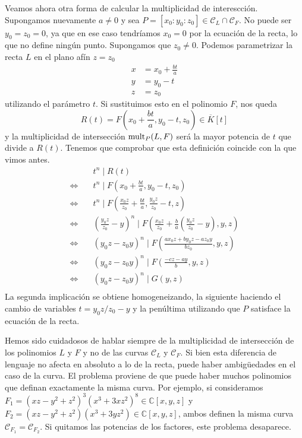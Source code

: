 \documentclass[a4paper, 11pt]{article}
\newcommand{\CC}{\mathbb{C}}
\theoremstyle{plain}
\theoremstyle{definition}
\begin{document}
Veamos ahora otra forma de calcular la multiplicidad de interescción. Supongamos
nuevamente $a\neq 0$ y sea $P=[x_0:y_0:z_0]\in\mathcal{C}_L\cap\mathcal{C}_F$. No
puede ser $y_0=z_0=0$, ya que en ese caso tendríamos $x_0=0$ por la ecuación de la recta,
lo que no define ningún punto. Supongamos que $z_0\neq 0$. Podemos parametrizar la recta
$L$ en el plano afín $z=z_0$
\[
\begin{aligned}
 x & = x_0 + \frac{bt}{a}\\
 y & = y_0 - t \\
 z & = z_0
\end{aligned}
\]
utilizando el parámetro $t$. Si sustituimos esto en el polinomio $F$, nos queda
\[
  R(t)=F\left(x_0+\frac{bt}{a},y_0-t,z_0\right)\in\overline{K}[t]
\]
y la multiplicidad de intersección ${\rm mult}_P(L,F)$ será la mayor potencia de $t$
que divide a $R(t)$. Tenemos que comprobar que esta definición coincide con la que
vimos antes.
\[
\begin{aligned}
 & t^n\mid R(t) \\
\Longleftrightarrow\quad
 & t^n\mid F\left(x_0+\frac{bt}{a},y_0-t,z_0\right) \\
\Longleftrightarrow\quad
 & t^n\mid F\left(\frac{x_0z}{z_0}+\frac{bt}{a},\frac{y_0z}{z_0}-t,z\right) \\
\Longleftrightarrow\quad
 & \left(\frac{y_0z}{z_0}-y\right)^n\mid
    F\left(\frac{x_0z}{z_0}+\frac{b}{a}\left(\frac{y_0z}{z_0}-y\right),y,z\right) \\
\Longleftrightarrow\quad
 & (y_0z-z_0y)^n\mid F\left(\frac{ax_0z+by_0z-az_0y}{bz_0},y,z\right) \\
\Longleftrightarrow\quad
 & (y_0z-z_0y)^n\mid F\left(\frac{-cz-ay}{b},y,z\right) \\
\Longleftrightarrow\quad
 & (y_0z-z_0y)^n\mid G(y,z) \\
\end{aligned}
\]
La segunda implicación se obtiene homogeneizando, la siguiente haciendo el
cambio de variables $t=y_0z/z_0-y$ y la penúltima utilizando que $P$ satisface
la ecuación de la recta.

\bigskip

Hemos sido cuidadosos de hablar siempre de la multiplicidad de intersección de
los polinomios $L$ y $F$ y no de las curvas $\mathcal{C}_L$ y $\mathcal{C}_F$.
Si bien esta diferencia de lenguaje no afecta en absoluto a lo de la recta,
puede haber ambigüedades en el caso de la curva. El problema proviene de que
puede haber muchos polinomios que definan exactamente la misma curva. Por
ejemplo, si consideramos $F_1=(xz-y^2+z^2)^3(x^3+3xz^2)^8\in\CC[x,y,z]$ y
$F_2=(xz-y^2+z^2)(x^3+3yz^2)\in\CC[x,y,z]$, ambos definen la misma curva
$\mathcal{C}_{F_1}=\mathcal{C}_{F_2}$. Si quitamos las potencias de los factores,
este problema desaparece.
\end{document}
